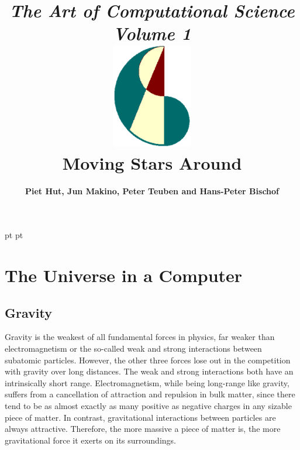 \documentclass{book}
\begin{document}
        pt
 pt


       
{\bf  }

{\bf  }

{\tt  }

 

\title{{\sl \huge The Art of Computational Science}\\
\bigskip
{\sl Volume 1}\\
\bigskip
\bigskip
\includegraphics[width=3.5cm]{acstitle.ps}\\
\bigskip
\bigskip
\bigskip
\bf Moving Stars Around
\bigskip
}
\author{\bf Piet Hut, Jun Makino, Peter Teuben and Hans-Peter Bischof}


\maketitle
\thispagestyle{empty}
\chapter{  The Universe in a Computer}
\label{sect:3}

\section{  Gravity}
\label{sect:4}

Gravity is the weakest of all fundamental forces in physics, far
weaker than electromagnetism or the so-called weak and strong
interactions between subatomic particles.  However, the other three
forces lose out in the competition with gravity over long distances.
The weak and strong interactions both have an intrinsically short
range.  Electromagnetism, while being long-range like gravity, suffers
from a cancellation of attraction and repulsion in bulk matter, since
there tend to be as almost exactly as many positive as negative
charges in any sizable piece of matter.  In contrast, gravitational
interactions between particles are always attractive.  Therefore, the
more massive a piece of matter is, the more gravitational force it
exerts on its surroundings.
\end{document}
